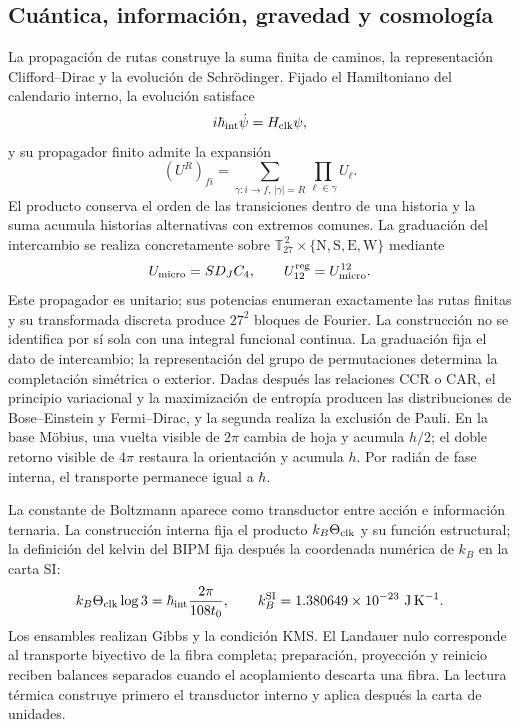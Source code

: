 \subsection*{Cuántica, información, gravedad y cosmología}

La propagación de rutas construye la suma finita de caminos, la
representación Clifford--Dirac y la evolución de Schrödinger. Fijado el
Hamiltoniano del calendario interno, la evolución satisface
\[
 i\hbar_{\rm int}\dot\psi=H_{\rm clk}\psi,
\]
y su propagador finito admite la expansión
\[
 (U^R)_{fi}=
 \sum_{\gamma:i\to f,\,|\gamma|=R}
 \prod_{\ell\in\gamma}U_\ell.
\]
El producto conserva el orden de las transiciones dentro de una historia y
la suma acumula historias alternativas con extremos comunes. La graduación
del intercambio se realiza concretamente sobre
\(\mathbb T_{27}^{\,2}\times\{\mathrm N,\mathrm S,\mathrm E,\mathrm W\}\)
mediante
\[
 U_{\rm micro}=S D_J C_4,
 \qquad U_{12}^{\rm reg}=U_{\rm micro}^{12}.
\]
Este propagador es unitario; sus potencias enumeran exactamente las rutas
finitas y su transformada discreta produce \(27^2\) bloques de Fourier. La
construcción no se identifica por sí sola con una integral funcional
continua. La graduación fija el dato de intercambio; la representación del
grupo de permutaciones determina la completación simétrica o exterior. Dadas
después las relaciones CCR o CAR, el principio variacional y la maximización
de entropía producen las
distribuciones de Bose--Einstein y Fermi--Dirac, y la segunda realiza la
exclusión de Pauli. En la base Möbius, una vuelta visible de \(2\pi\) cambia
de hoja y acumula \(h/2\); el doble retorno visible de \(4\pi\) restaura la
orientación y acumula \(h\). Por radián de fase interna, el transporte
permanece igual a \(\hbar\).

La constante de Boltzmann aparece como transductor entre acción e información
ternaria. La construcción interna fija el producto
\(k_B\Theta_{\rm clk}\) y su función estructural; la definición del kelvin
del BIPM fija después la coordenada numérica de \(k_B\) en la carta SI:
\[
 k_B\Theta_{\rm clk}\log3=\hbar_{\rm int}\frac{2\pi}{108t_0},
 \qquad
 k_B^{\rm SI}=1.380649\times10^{-23}\ \mathrm{J\,K^{-1}}.
\]
Los ensambles realizan Gibbs y la condición KMS. El Landauer nulo corresponde
al transporte biyectivo de la fibra completa; preparación, proyección y
reinicio reciben balances separados cuando el acoplamiento descarta una
fibra. La lectura térmica construye primero el transductor interno y aplica
después la carta de unidades.

